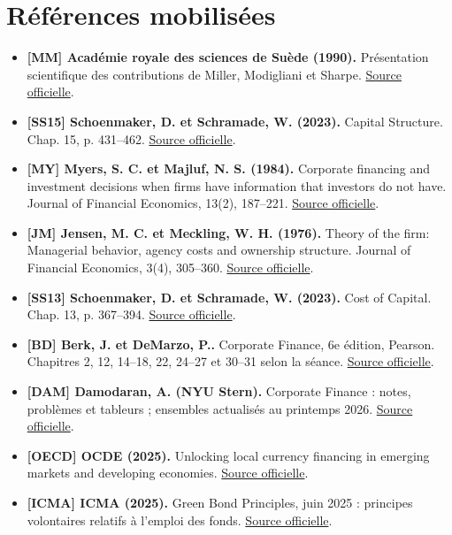 \documentclass[12pt,a4paper]{article}
\begin{document}
\section*{Références mobilisées}
\small
\begin{itemize}
\item \textbf{[MM] Académie royale des sciences de Suède (1990).} Présentation scientifique des contributions de Miller, Modigliani et Sharpe. \href{https://www.nobelprize.org/prizes/economic-sciences/1990/press-release/}{Source officielle}.
\item \textbf{[SS15] Schoenmaker, D. et Schramade, W. (2023).} Capital Structure. Chap. 15, p. 431--462. \href{https://doi.org/10.1007/978-3-031-35009-2_15}{Source officielle}.
\item \textbf{[MY] Myers, S. C. et Majluf, N. S. (1984).} Corporate financing and investment decisions when firms have information that investors do not have. Journal of Financial Economics, 13(2), 187--221. \href{https://doi.org/10.1016/0304-405X(84)90023-0}{Source officielle}.
\item \textbf{[JM] Jensen, M. C. et Meckling, W. H. (1976).} Theory of the firm: Managerial behavior, agency costs and ownership structure. Journal of Financial Economics, 3(4), 305--360. \href{https://doi.org/10.1016/0304-405X(76)90026-X}{Source officielle}.
\item \textbf{[SS13] Schoenmaker, D. et Schramade, W. (2023).} Cost of Capital. Chap. 13, p. 367--394. \href{https://doi.org/10.1007/978-3-031-35009-2_13}{Source officielle}.
\item \textbf{[BD] Berk, J. et DeMarzo, P..} Corporate Finance, 6e édition, Pearson. Chapitres 2, 12, 14--18, 22, 24--27 et 30--31 selon la séance. \href{https://www.pearson.com/en-us/subject-catalog/p/corporate-finance/P200000009791/9780137844906}{Source officielle}.
\item \textbf{[DAM] Damodaran, A. (NYU Stern).} Corporate Finance : notes, problèmes et tableurs ; ensembles actualisés au printemps 2026. \href{https://pages.stern.nyu.edu/~adamodar/New_Home_Page/cflect.htm}{Source officielle}.
\item \textbf{[OECD] OCDE (2025).} Unlocking local currency financing in emerging markets and developing economies. \href{https://www.oecd.org/content/dam/oecd/en/publications/reports/2025/02/unlocking-local-currency-financing-in-emerging-markets-and-developing-economies_af15df6a/bc84fde7-en.pdf}{Source officielle}.
\item \textbf{[ICMA] ICMA (2025).} Green Bond Principles, juin 2025 : principes volontaires relatifs à l’emploi des fonds. \href{https://www.icmagroup.org/assets/documents/Sustainable-finance/2025-updates/Green-Bond-Principles-GBP-June-2025.pdf}{Source officielle}.

\end{itemize}
\end{document}
